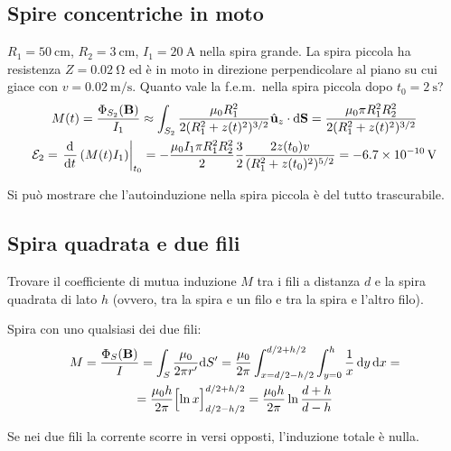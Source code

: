 \subsection{Spire concentriche in moto}

$R_1 = \qty{50}{\centi\metre}$, $R_2 = \qty{3}{\centi\metre}$, $I_1 = \qty{20}{\ampere}$ nella spira grande.
La spira piccola ha resistenza $Z = \qty{0.02}{\ohm}$ ed è in moto in direzione perpendicolare al piano su cui giace con $v = \qty{0.02}{\metre\per\second}$.
Quanto vale la f.e.m.\ nella spira piccola dopo $t_0 = \qty{2}{\second}$?
\begin{gather}
    M(t) = \frac{\Phi_{S_2}(\B)}{I_1}
    \approx \int_{S_2} \frac{\mu_0 R_1^2}{2 (R_1^2 + z(t)^2)^{3/2}} \uz \sde
    = \frac{\mu_0 \pi R_1^2 R_2^2}{2 (R_1^2 + z(t)^2)^{3/2}} \\
    \fem_2 = \evalat{\der{t} \pts{M(t) I_1}}{t_0}
    = -\frac{\mu_0 I_1 \pi R_1^2 R_2^2}{2}
    \frac{3}{2}
    \frac{2 z(t_0) v}{(R_1^2 + z(t_0)^2)^{5/2}}
    = -\qty{6.7e-10}{\volt}
\end{gather}

Si può mostrare che l'autoinduzione nella spira piccola è del tutto trascurabile.


\subsection{Spira quadrata e due fili}

Trovare il coefficiente di mutua induzione $M$ tra i fili a distanza $d$ e la spira quadrata di lato $h$ (ovvero, tra la spira e un filo e tra la spira e l'altro filo).

Spira con uno qualsiasi dei due fili:
\begin{equation}
\begin{gathered}
    M = \frac{\Phi_S(\mathbf{B})}{I}
    = \int_S \frac{\mu_0}{2\pi r'} \mathrm{d} S'
    = \frac{\mu_0}{2\pi} \int_{x = d/2 - h/2}^{d/2 + h/2} \int_{y = 0}^h \frac{1}{x} \, \mathrm{d} y \, \mathrm{d} x = \\
    = \frac{\mu_0 h}{2\pi} \Big[\!\ln x\Big]_{d/2 - h/2}^{d/2 + h/2}
    = \frac{\mu_0 h}{2\pi} \ln \frac{d + h}{d - h}
\end{gathered}
\end{equation}

Se nei due fili la corrente scorre in versi opposti, l'induzione totale è nulla.
